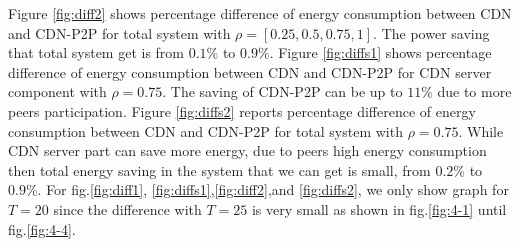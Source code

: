 \documentclass[JIP]{ipsj}
\begin{document}
Figure \ref{fig:diff2} shows percentage difference of energy consumption between CDN and CDN-P2P for total system with $\rho=[0.25,0.5,0.75,1]$.
The power saving that total system get is from $0.1\%$ to $0.9\%$.
Figure \ref{fig:diffs1} shows percentage difference of energy consumption between CDN and CDN-P2P for CDN server component with $\rho=0.75$.
The saving of CDN-P2P can be up to $11\%$ due to more peers participation. 
Figure \ref{fig:diffs2} reports percentage difference of energy consumption between CDN and CDN-P2P for total system with $\rho=0.75$.
While CDN server part can save more energy, due to peers high energy consumption then total energy saving in the system that we can get is small, from $0.2\%$ to $0.9\%$.
For fig.\ref{fig:diff1}, \ref{fig:diffs1},\ref{fig:diff2},and \ref{fig:diffs2}, we only show graph for $T=20$ since the difference with $T=25$ is very small as shown in fig.\ref{fig:4-1} until fig.\ref{fig:4-4}.
\end{document}
